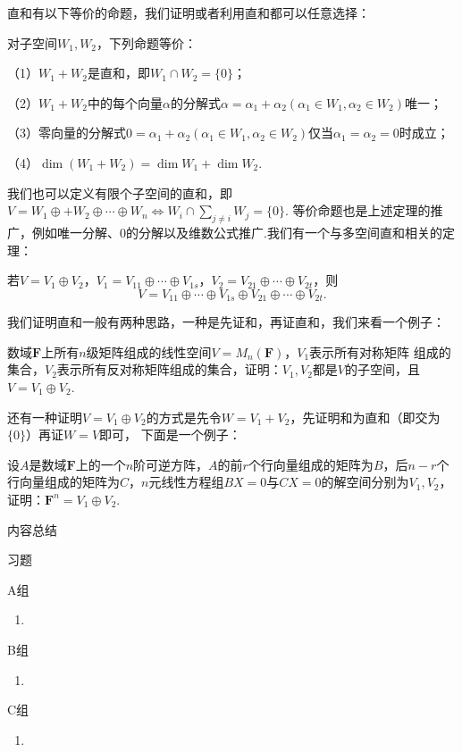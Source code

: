 直和有以下等价的命题，我们证明或者利用直和都可以任意选择：
\begin{theorem}
	对子空间$W_1,W_2$，下列命题等价：

	\textup{（1）}$W_1+W_2$是直和，即$W_1 \cap W_2=\{0\}$；

	\textup{（2）}$W_1+W_2$中的每个向量$\alpha$的分解式$\alpha=\alpha_1+\alpha_2(\alpha_1\in W_1,\alpha_2\in W_2)$唯一；

	\textup{（3）}零向量的分解式$0=\alpha_1+\alpha_2(\alpha_1\in W_1,\alpha_2\in W_2)$仅当$\alpha_1=\alpha_2=0$时成立；

	\textup{（4）}$\dim (W_1+W_2)=\dim W_1+\dim W_2$.
\end{theorem}
我们也可以定义有限个子空间的直和，即$V=W_1\oplus+W_2\oplus\cdots\oplus W_n \iff W_i \cap \sum\limits_{j \neq i}W_j=\{0\}$.
等价命题也是上述定理的推广，例如唯一分解、0的分解以及维数公式推广.我们有一个与多空间直和相关的定理：
\begin{theorem}
	若$V=V_1\oplus V_2$，$V_1=V_{11}\oplus\cdots\oplus V_{1s}$，$V_2=V_{21}\oplus\cdots\oplus V_{2t}$，则
	$$V=V_{11}\oplus\cdots\oplus V_{1s}\oplus V_{21}\oplus\cdots\oplus V_{2t}.$$
\end{theorem}
我们证明直和一般有两种思路，一种是先证和，再证直和，我们来看一个例子：
\begin{example}
	数域$\mathbf{F}$上所有$n$级矩阵组成的线性空间$V=M_n(\mathbf{F})$，$V_1$表示所有对称矩阵
	组成的集合，$V_2$表示所有反对称矩阵组成的集合，证明：$V_1,V_2$都是$V$的子空间，且$V=V_1\oplus V_2$.
\end{example}
还有一种证明$V=V_1\oplus V_2$的方式是先令$W=V_1+V_2$，先证明和为直和（即交为$\{0\}$）再证$W=V$即可，
下面是一个例子：
\begin{example}
	设$A$是数域$\mathbf{F}$上的一个$n$阶可逆方阵，$A$的前$r$个行向量组成的矩阵为$B$，后$n-r$个
	行向量组成的矩阵为$C$，$n$元线性方程组$BX=0$与$CX=0$的解空间分别为$V_1,V_2$，证明：$\mathbf{F}^n=V_1\oplus V_2$.
\end{example}

\vspace{2ex} 
\centerline{\heiti \Large 内容总结}

\vspace{2ex} 

\centerline{\heiti \Large 习题}
\vspace{2ex} 
{\kaishu }
\begin{flushright}
    \kaishu

\end{flushright}
\centerline{\heiti A组}
\begin{enumerate}
	\item 
\end{enumerate}
\centerline{\heiti B组}
\begin{enumerate}
	\item 
\end{enumerate}
\centerline{\heiti C组}
\begin{enumerate}
	\item 
\end{enumerate}